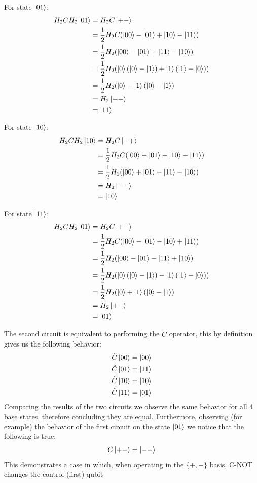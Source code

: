 For state $\ket{01}$:
\begin{align*}
    H_2 C H_2\ket{01}
    &=H_2 C\ket{+-}\\
    &=\frac{1}{2}H_2 C(\ket{00}-\ket{01}+\ket{10}-\ket{11})\\
    &=\frac{1}{2}H_2(\ket{00}-\ket{01}+\ket{11}-\ket{10})\\
    &=\frac{1}{2}H_2(\ket{0}(\ket{0}-\ket{1})+\ket{1}(\ket{1}-\ket{0}))\\
    &=\frac{1}{2}H_2(\ket{0}-\ket{1}(\ket{0}-\ket{1})\\
    &=H_2\ket{--}\\
    &=\ket{11}
\end{align*}

For state $\ket{10}$:
\begin{align*}
    H_2 C H_2\ket{10}
    &=H_2 C\ket{-+}\\
    &=\frac{1}{2}H_2 C(\ket{00}+\ket{01}-\ket{10}-\ket{11})\\
    &=\frac{1}{2}H_2(\ket{00}+\ket{01}-\ket{11}-\ket{10})\\
    &=H_2\ket{-+}\\
    &=\ket{10}
\end{align*}

For state $\ket{11}$:
\begin{align*}
    H_2 C H_2\ket{01}
    &=H_2 C\ket{+-}\\
    &=\frac{1}{2}H_2 C(\ket{00}-\ket{01}-\ket{10}+\ket{11})\\
    &=\frac{1}{2}H_2(\ket{00}-\ket{01}-\ket{11}+\ket{10})\\
    &=\frac{1}{2}H_2(\ket{0}(\ket{0}-\ket{1})-\ket{1}(\ket{1}-\ket{0}))\\
    &=\frac{1}{2}H_2(\ket{0}+\ket{1}(\ket{0}-\ket{1})\\
    &=H_2\ket{+-}\\
    &=\ket{01}
\end{align*}

The second circuit is equivalent to performing the $\tilde{C}$ operator, this by definition gives us the following behavior:
\begin{align*}
    \tilde{C}\ket{00} &= \ket{00}\\
    \tilde{C}\ket{01} &= \ket{11}\\
    \tilde{C}\ket{10} &= \ket{10}\\
    \tilde{C}\ket{11} &= \ket{01}\\
\end{align*}
Comparing the results of the two circuits we observe the same behavior for all 4 base states, therefore concluding they are equal.
Furthermore, observing (for example) the behavior of the first circuit on the state $\ket{01}$ we notice that the following is true:
\[
    C\ket{+-} = \ket{--}
\]
This demonstrates a case in which, when operating in the $\{+,-\}$ basis, C-NOT changes the control (first) qubit